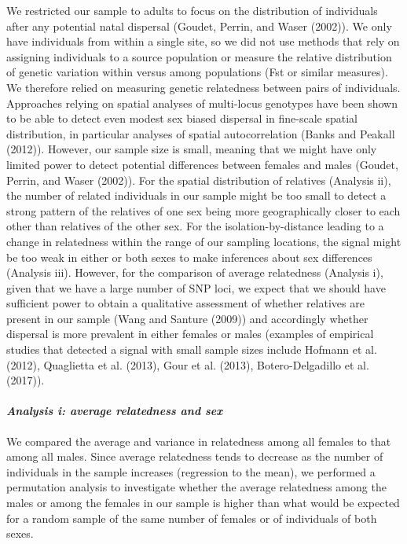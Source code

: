 \documentclass[]{article}
\let\oldparagraph\paragraph
\renewcommand{\paragraph}[1]{\oldparagraph{#1}\mbox{}}
\begin{document}
We restricted our sample to adults to focus on the distribution of
individuals after any potential natal dispersal (Goudet, Perrin, and
Waser (2002)). We only have individuals from within a single site, so we
did not use methods that rely on assigning individuals to a source
population or measure the relative distribution of genetic variation
within versus among populations (Fst or similar measures). We therefore
relied on measuring genetic relatedness between pairs of individuals.
Approaches relying on spatial analyses of multi-locus genotypes have
been shown to be able to detect even modest sex biased dispersal in
fine-scale spatial distribution, in particular analyses of spatial
autocorrelation (Banks and Peakall (2012)). However, our sample size is
small, meaning that we might have only limited power to detect potential
differences between females and males (Goudet, Perrin, and Waser
(2002)). For the spatial distribution of relatives (Analysis ii), the
number of related individuals in our sample might be too small to detect
a strong pattern of the relatives of one sex being more geographically
closer to each other than relatives of the other sex. For the
isolation-by-distance leading to a change in relatedness within the
range of our sampling locations, the signal might be too weak in either
or both sexes to make inferences about sex differences (Analysis iii).
However, for the comparison of average relatedness (Analysis i), given
that we have a large number of SNP loci, we expect that we should have
sufficient power to obtain a qualitative assessment of whether relatives
are present in our sample (Wang and Santure (2009)) and accordingly
whether dispersal is more prevalent in either females or males (examples
of empirical studies that detected a signal with small sample sizes
include Hofmann et al. (2012), Quaglietta et al. (2013), Gour et al.
(2013), Botero-Delgadillo et al. (2017)).

\hypertarget{analysis-i-average-relatedness-and-sex}{%
\paragraph{\texorpdfstring{\emph{Analysis i: average relatedness and
sex}}{Analysis i: average relatedness and sex}}\label{analysis-i-average-relatedness-and-sex}}

We compared the average and variance in relatedness among all females to
that among all males. Since average relatedness tends to decrease as the
number of individuals in the sample increases (regression to the mean),
we performed a permutation analysis to investigate whether the average
relatedness among the males or among the females in our sample is higher
than what would be expected for a random sample of the same number of
females or of individuals of both sexes.
\end{document}
